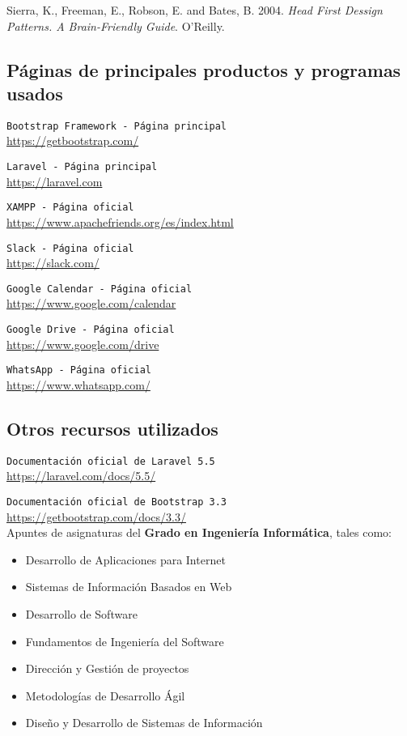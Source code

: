 Sierra, K., Freeman, E., Robson, E. and Bates, B. 2004. {\em Head First Dessign Patterns. A Brain-Friendly Guide}. O'Reilly.

\subsection*{Páginas de principales productos y programas usados}

 {\tt Bootstrap Framework - Página principal}\\
\url{https://getbootstrap.com/}

 {\tt Laravel - Página principal}\\
\url{https://laravel.com}

 {\tt XAMPP - Página oficial}\\
\url{https://www.apachefriends.org/es/index.html}

 {\tt Slack - Página oficial}\\
\url{https://slack.com/}

 {\tt Google Calendar - Página oficial}\\
\url{https://www.google.com/calendar}

 {\tt Google Drive - Página oficial}\\
\url{https://www.google.com/drive}

 {\tt WhatsApp - Página oficial}\\
\url{https://www.whatsapp.com/}

\subsection*{Otros recursos utilizados}

 {\tt Documentación oficial de Laravel 5.5}\\
\url{https://laravel.com/docs/5.5/}

 {\tt Documentación oficial de Bootstrap 3.3}\\
\url{https://getbootstrap.com/docs/3.3/}\\

Apuntes de asignaturas del \textbf{Grado en Ingeniería Informática}, tales como:
\begin{itemize}
    \item Desarrollo de Aplicaciones para Internet
    \item Sistemas de Información Basados en Web
    \item Desarrollo de Software
    \item Fundamentos de Ingeniería del Software
    \item Dirección y Gestión de proyectos
    \item Metodologías de Desarrollo Ágil
    \item Diseño y Desarrollo de Sistemas de Información
\end{itemize}
